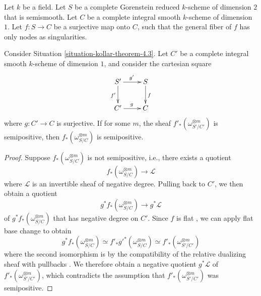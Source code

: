 \begin{situation}
\label{situation-kollar-theorem-4.3}
Let $k$ be a field.
Let $S$ be a complete Gorenstein reduced $k$-scheme of dimension $2$ that is
semismooth.
Let $C$ be a complete integral smooth $k$-scheme of dimension $1$.
Let $f : S \to C$ be a surjective map onto $C$, such that the general fiber of
$f$ has only nodes as singularities.
\end{situation}

\begin{lemma}
\label{lemma-base-change-okay}
Consider Situation \ref{situation-kollar-theorem-4.3}.
Let $C'$ be a complete integral smooth $k$-scheme of dimension $1$, and
consider the cartesian square
$$
\xymatrix{
S' \ar[d]_{f'}\ar[r]^{g'} & S\ar[d]^f\\
C' \ar[r]^g & C
}
$$
where $g: C' \to C$ is surjective.
If for some $m$, the sheaf $f'_*(\omega_{S'/C'}^{\otimes m})$ is semipositive,
then $f_*(\omega_{S/C}^{\otimes m})$ is semipositive.
\end{lemma}
\begin{proof}
Suppose $f_*(\omega_{S/C}^{\otimes m})$ is not semipositive, i.e., there
exists a quotient
$$f_*(\omega_{S/C}^{\otimes m}) \longrightarrow \mathcal{L}$$
where $\mathcal{L}$ is an invertible sheaf of negative degree.
Pulling back to $C'$, we then obtain a quotient
$$g^*f_*(\omega_{S/C}^{\otimes m}) \longrightarrow g^*\mathcal{L}$$
of $g^*f_*(\omega_{S/C}^{\otimes m})$ that has negative degree on $C'$.
Since $f$ is flat \cite[\href{http://stacks.math.columbia.edu/tag/00R4}{Tag
00R4}]{stacks-project}, we can apply flat base change
\cite[\href{http://stacks.math.columbia.edu/tag/02KH}{Tag 02KH}]{stacks-project}
to obtain
$$
g^*f_*(\omega_{S/C}^{\otimes m})
\simeq f'_*g'^*(\omega_{S/C}^{\otimes m})
\simeq f'_*(\omega_{S'/C'}^{\otimes m})
$$
where the second isomorphism is
by the compatibility of the relative dualizing sheaf with pullbacks
\cite[\href{http://stacks.math.columbia.edu/tag/0E4P}{Tag
0E4P}]{stacks-project}.
We therefore obtain a negative quotient $g^*\mathcal{L}$ of
$f'_*(\omega_{S'/C'}^{\otimes m})$, which contradicts the assumption that
$f'_*(\omega_{S'/C'}^{\otimes m})$ was semipositive.
\end{proof}


